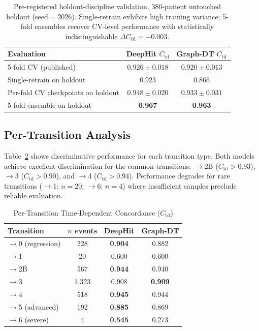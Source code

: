 \begin{table}[!t]
\centering
\caption{Pre-registered holdout-discipline validation. 380-patient untouched holdout (seed${=}2026$). Single-retrain exhibits high training variance; 5-fold ensembles recover CV-level performance with statistically indistinguishable $\Delta C_\text{td}{=}{-}0.003$.}
\label{p3:tab:holdout}
\small
\setlength{\tabcolsep}{4pt}
\begin{tabular}{lcc}
\toprule
Evaluation & DeepHit $C_\text{td}$ & Graph-DT $C_\text{td}$ \\
\midrule
5-fold CV (published)                   & $0.926 \pm 0.018$ & $0.920 \pm 0.013$ \\
Single-retrain on holdout               & $0.923$           & $0.866$           \\
Per-fold CV checkpoints on holdout      & $0.948 \pm 0.020$ & $0.933 \pm 0.031$ \\
5-fold ensemble on holdout              & \textbf{0.967}    & \textbf{0.963}    \\
\bottomrule
\end{tabular}
\end{table}

\subsection{Per-Transition Analysis}

Table~\ref{p3:tab:pertrans} shows discriminative performance for each transition type. Both models achieve excellent discrimination for the common transitions: $\to$2B ($C_\text{td} > 0.93$), $\to$3 ($C_\text{td} > 0.90$), and $\to$4 ($C_\text{td} > 0.94$). Performance degrades for rare transitions ($\to$1: $n{=}20$; $\to$6: $n{=}4$) where insufficient samples preclude reliable evaluation.

\begin{table}[!t]
\centering
\caption{Per-Transition Time-Dependent Concordance ($C_\text{td}$)}
\label{p3:tab:pertrans}
\small
\begin{tabular}{lccc}
\toprule
Transition & $n$ events & DeepHit & Graph-DT \\
\midrule
$\to$0 (regression) & 228 & \textbf{0.904} & 0.882 \\
$\to$1 & 20 & 0.600 & 0.600 \\
$\to$2B & 567 & \textbf{0.944} & 0.940 \\
$\to$3 & 1,323 & 0.908 & \textbf{0.909} \\
$\to$4 & 518 & \textbf{0.945} & 0.944 \\
$\to$5 (advanced) & 192 & \textbf{0.885} & 0.869 \\
$\to$6 (severe) & 4 & \textbf{0.545} & 0.273 \\
\bottomrule
\end{tabular}
\end{table}

